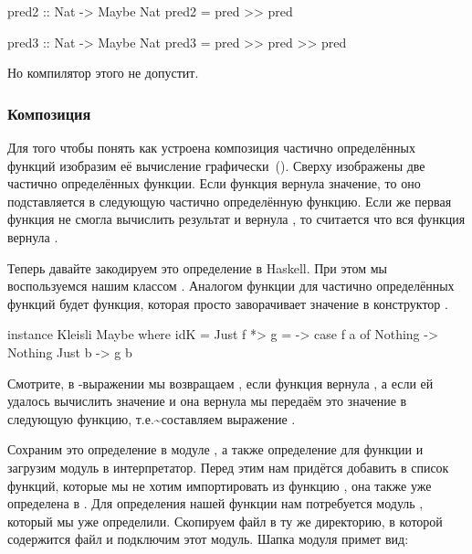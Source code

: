 \begin{code}
pred2 :: Nat -> Maybe Nat
pred2 = pred >> pred

pred3 :: Nat -> Maybe Nat
pred3 = pred >> pred >> pred
\end{code}

Но компилятор этого не допустит.

\subsubsection{Композиция}

Для того чтобы понять как устроена композиция частично определённых
функций изобразим её вычисление графически~(). Сверху
изображены две частично определённых функции. Если функция 
вернула значение, то оно подставляется в следующую частично определённую
функцию. Если же первая функция не смогла вычислить результат и вернула
, то считается что вся функция  вернула
.


Теперь давайте закодируем это определение в Haskell. При этом мы
воспользуемся нашим классом . Аналогом функции  для
частично определённых функций будет функция, которая просто заворачивает
значение в конструктор .


\begin{code}
instance Kleisli Maybe where
    idK    = Just
    f *> g = \a -> case f a of
                        Nothing -> Nothing
                        Just b  -> g b
\end{code}

Смотрите, в -выражении мы возвращаем , если функция
 вернула , а если ей удалось вычислить значение и она
вернула  мы передаём это значение в следующую функцию,
т.е.\textasciitilde{}составляем выражение .

Сохраним это определение в модуле , а также определение для
функции  и загрузим модуль в интерпретатор. Перед этим нам
придётся добавить в список функций, которые мы не хотим импортировать из
 функцию , она также уже определена в .
Для определения нашей функции нам потребуется модуль , который
мы уже определили. Скопируем файл  в ту же директорию, в
которой содержится файл  и подключим этот модуль. Шапка
модуля примет вид:


